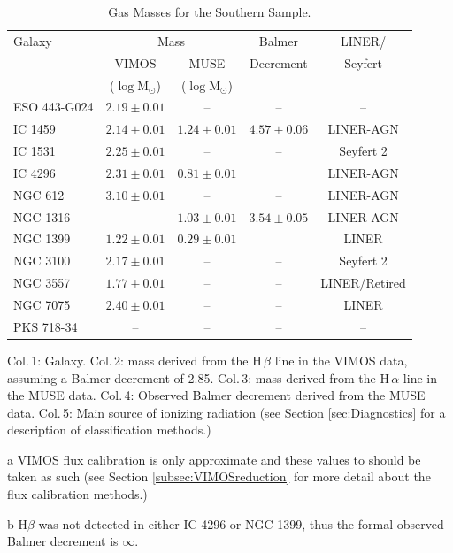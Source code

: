 		\begin{table}
			\centering
		\begin{threeparttable}
			\caption{Gas Masses for the Southern Sample.}
			\label{tab:gasMass}
			\begin{tabular}{l c c c c}
				\hline
				\hline
				Galaxy & \multicolumn{2}{c}{\ion{H}{ii} Mass} & Balmer & LINER/ \\
				& VIMOS\tnote{a} & MUSE & Decrement & Seyfert \\
				& ($\log\mathrm{M_\odot}$) & ($\log\mathrm{M_\odot}$) & \\
				\hline
				ESO 443-G024 & $2.19 \pm 0.01$ 	& --  		& -- & -- \\
				IC 1459 	& $2.14 \pm 0.01$	& $1.24 \pm 0.01$ & $4.57 \pm 0.06$ & LINER-AGN\\
				IC 1531 	& $2.25 \pm 0.01$	& -- 		& -- & Seyfert 2\\
				IC 4296		& $2.31 \pm 0.01$	& $0.81 \pm 0.01$ & \tnote{b} & LINER-AGN \\
				NGC 612 	& $3.10 \pm 0.01$ 	& -- 		& -- & LINER-AGN \\
				NGC 1316 	& -- 				& $ 1.03 \pm 0.01$ & $3.54 \pm 0.05$ & LINER-AGN \\
				NGC 1399 	& $1.22 \pm 0.01$ 	& $ 0.29 \pm 0.01$ & \tnote{b} & LINER \\
				NGC 3100 	& $2.17 \pm 0.01$	& -- 		& -- & Seyfert 2 \\
				NGC 3557 	& $1.77 \pm 0.01$ 	& -- 		& -- & LINER/Retired \\
				NGC 7075 	& $2.40 \pm 0.01$	& -- 		& -- & LINER \\
				PKS 718-34  & --		 		& -- 		& -- & -- \\
				\hline
				\hline
			\end{tabular}
			\begin{tablenotes}
			\footnotesize
			\note Col.\,1: Galaxy. Col.\,2:  mass derived from the H\,$\beta$ line in the VIMOS data, assuming a Balmer decrement of 2.85. Col.\,3:  mass derived from the H\,$\alpha$ line in the MUSE data. Col.\,4: Observed Balmer decrement derived from the MUSE data. Col.\,5: Main source of ionizing radiation (see Section \ref{sec:Diagnostics} for a description of classification methods.)
			\item [a] VIMOS flux calibration is only approximate and these values to should be taken as such (see Section \ref{subsec:VIMOSreduction} for more detail about the flux calibration methods.)
			\item [b] H$\beta$ was not detected in either IC 4296 or NGC 1399, thus the formal observed Balmer decrement is $\infty$.

			\end{tablenotes}
		\end{threeparttable}
		\end{table}
		

